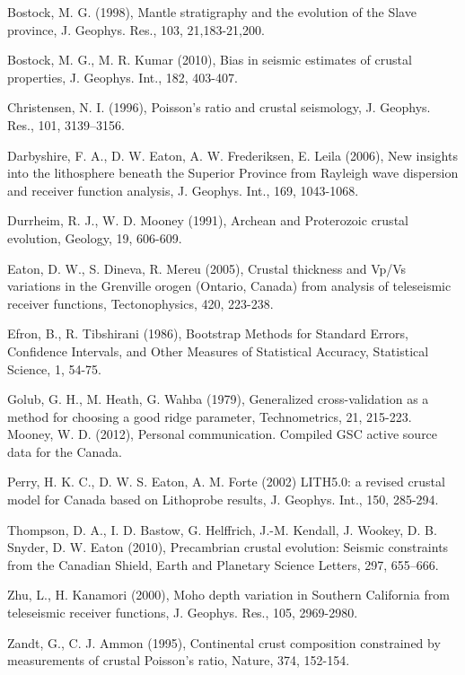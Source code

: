 \documentclass[draft, 12pt]{article}
\begin{document}
\begin{thebibliography}
Bostock, M. G. (1998), Mantle stratigraphy and the evolution of the Slave province, J. Geophys. Res., 103, 21,183-21,200.

Bostock, M. G., M. R. Kumar (2010), Bias in seismic estimates of crustal properties, J. Geophys. Int., 182, 403-407.

Christensen, N. I. (1996), Poisson's ratio and crustal seismology, J. Geophys. Res., 101, 3139–3156.

Darbyshire, F. A., D. W. Eaton, A. W. Frederiksen, E. Leila (2006), New insights into the lithosphere beneath the Superior Province from Rayleigh wave dispersion and receiver function analysis, J. Geophys. Int., 169, 1043-1068.

Durrheim, R. J., W. D. Mooney (1991), Archean and Proterozoic crustal evolution, Geology, 19, 606-609.

Eaton, D. W., S. Dineva, R. Mereu (2005), Crustal thickness and Vp/Vs variations in the Grenville orogen (Ontario, Canada) from analysis of teleseismic receiver functions, Tectonophysics, 420, 223-238.

Efron, B., R. Tibshirani (1986), Bootstrap Methods for Standard Errors, Confidence Intervals, and Other Measures of Statistical Accuracy, Statistical Science, 1, 54-75.

Golub, G. H., M. Heath, G. Wahba (1979), Generalized cross-validation as a method for choosing a good ridge parameter, Technometrics, 21, 215-223.
Mooney, W. D. (2012), Personal communication. Compiled GSC active source data for the Canada.

Perry, H. K. C., D. W. S. Eaton, A. M. Forte (2002) LITH5.0: a revised crustal model for Canada based on Lithoprobe results,  J. Geophys. Int., 150, 285-294.

Thompson, D. A., I. D. Bastow, G. Helffrich, J.-M. Kendall, J. Wookey, D. B. Snyder, D. W. Eaton (2010), Precambrian crustal evolution: Seismic constraints from the Canadian Shield, Earth and Planetary Science Letters, 297, 655–666.

Zhu, L., H. Kanamori (2000), Moho depth variation in Southern California from teleseismic receiver functions, J. Geophys. Res., 105, 2969-2980.

Zandt, G., C. J. Ammon (1995), Continental crust composition constrained by measurements of crustal Poisson's ratio, Nature, 374, 152-154.

\end{thebibliography}
\end{document}
